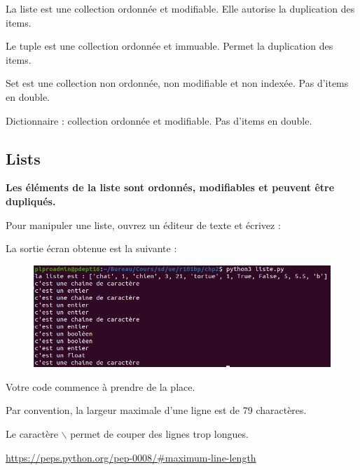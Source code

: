 
    La liste est une collection ordonnée et modifiable. Elle autorise la duplication des items.
    
    Le tuple est une collection ordonnée et immuable. Permet la duplication des items.
    
    Set est une collection non ordonnée, non modifiable et non indexée. Pas d'items en double.
    
    Dictionnaire : collection ordonnée et modifiable. Pas d'items en double.
\subsection{Lists}

\textbf{Les éléments de la liste sont ordonnés, modifiables et peuvent être dupliqués.}

Pour manipuler une liste, ouvrez un éditeur de texte et
écrivez :



La sortie écran obtenue est la suivante : 

\begin{figure}[H]
    \centering
    \includegraphics[scale = 0.7]{chapitre2/figures/liste1.png}
\end{figure}

\begin{tcolorbox}[lefttitle=2cm, colframe=gray!75!blue, title= \textbf{Tip for Code 1 : "\textit{Pour un code svelte et en bonne santé}"}]

Votre code commence à prendre de la place.

Par convention, la largeur maximale d'une ligne est de 79 charactères.

Le caractère $\backslash$ permet de couper des lignes trop longues. 

\url{https://peps.python.org/pep-0008/#maximum-line-length}

\end{tcolorbox}


